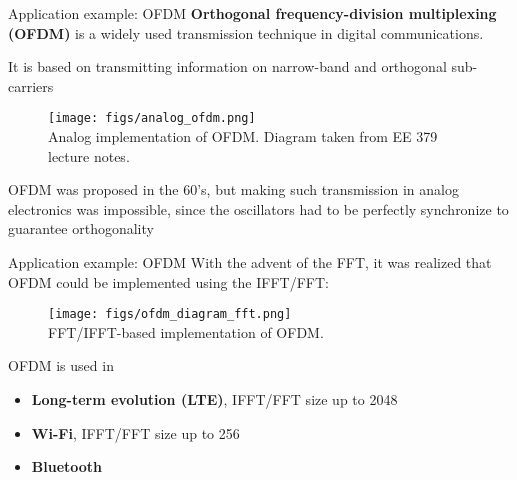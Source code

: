 \documentclass[10pt, aspectratio=169]{beamer}
\begin{document}
%
\begin{frame}{Application example: OFDM}
\textbf{Orthogonal frequency-division multiplexing (OFDM)} is a widely used transmission technique in digital communications.

It is based on transmitting information on narrow-band and orthogonal sub-carriers

\begin{figure}
	\centering
	\texttt{[image: figs/analog\_ofdm.png]}\\
	{\color{gray} \small Analog implementation of OFDM. Diagram taken from EE 379 lecture notes.}
\end{figure}

OFDM was proposed in the 60's, but making such transmission in analog electronics was impossible, since the oscillators had to be perfectly synchronize to guarantee orthogonality
\end{frame}


%
\begin{frame}{Application example: OFDM}
With the advent of the FFT, it was realized that OFDM could be implemented using the IFFT/FFT:

\begin{figure}
	\centering
	\texttt{[image: figs/ofdm\_diagram\_fft.png]}\\
	{\color{gray} \small FFT/IFFT-based implementation of OFDM.}
\end{figure}


OFDM is used in
\begin{itemize}
	\item \textbf{Long-term evolution (LTE)}, IFFT/FFT size up to 2048
	\item \textbf{Wi-Fi}, IFFT/FFT size up to 256
	\item \textbf{Bluetooth}
\end{itemize} 
\end{frame}
\end{document}
